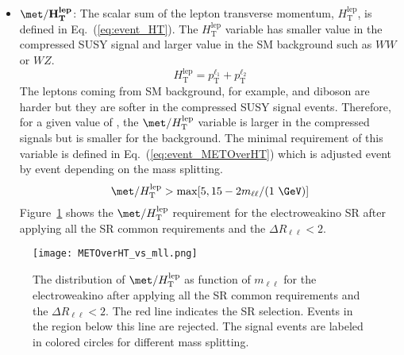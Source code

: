 \begin{itemize}
    \item $\mathbf{\met/H_{T}^{lep}}$: The scalar sum of the lepton transverse momentum, $H_{\textrm{T}}^{\textrm{lep}}$, is defined  in Eq.~(\ref{eq:event_HT}).
    The $H_{\textrm{T}}^{\textrm{lep}}$ variable has smaller value in the compressed SUSY signal and larger value in the SM background such as $WW$ or $WZ$.
    \begin{equation}
        H_{\textrm{T}}^{\textrm{lep}} = p_{\textrm{T}}^{\ell_{1}} + p_{\textrm{T}}^{\ell_{2}}
        \label{eq:event_HT}
    \end{equation}
    The leptons coming from SM background, for example, \ttbar and diboson are harder but they are softer in the compressed SUSY signal events.
    Therefore, for a given value of \met, the $\met/H_{\textrm{T}}^{\textrm{lep}}$ variable is larger in the compressed signals but is smaller for the background.
    The minimal requirement of this variable is defined in Eq.~(\ref{eq:event_METOverHT}) which is adjusted event by event depending on the mass splitting.
    \begin{equation}
        \met/H_{\textrm{T}}^{\textrm{lep}} > \mathrm{max}[5, 15 - 2 m_{\ell\ell}/(1~{\GeV})]
        \label{eq:event_METOverHT}
    \end{equation}
    Figure~\ref{fig:event_METOverHT} shows the $\met/H_{\textrm{T}}^{\textrm{lep}}$ requirement for the electroweakino SR after applying all the SR common requirements and the $\Delta R_{\ell\ell} < 2$.
\end{itemize}

\begin{figure}[htbp]
    \begin{center}
        \texttt{[image: METOverHT\_vs\_mll.png]}
        \caption{The distribution of $\met/H_{\textrm{T}}^{\textrm{lep}}$ as function of $m_{\ell\ell}$ for the electroweakino after applying all the SR common requirements and the $\Delta R_{\ell\ell} < 2$.
        The red line indicates the SR selection.
        Events in the region below this line are rejected.
        The signal events are labeled in colored circles for different mass splitting.}
        \label{fig:event_METOverHT}
    \end{center}
\end{figure}


